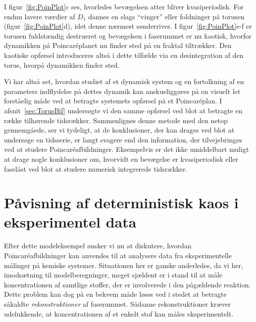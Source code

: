 \vspace{4.0mm}
I figur~\ref{fig:PoinPlot}c ses, hvorledes bev{\ae}gelsen
atter bliver kvasiperiodisk. For endnu lavere v{\ae}rdier
af $D_1$ dannes en slags ``vinger'' eller foldninger p{\aa}
torusen (figur~\ref{fig:PoinPlot}d), idet denne n{\ae}rmest
s{\o}nderrives. I figur~\ref{fig:PoinPlot}e-f er torusen
fuld\-st{\ae}n\-dig destrueret og bev{\ae}gelsen i
faserummet er nu kaotisk, hvorfor dynamikken p{\aa}
Poincar\'{e}planet nu finder sted p{\aa} en fraktal
tiltr{\ae}kker. Den kaotiske opf{\o}rsel introduceres
alts{\aa} i dette tilf{\ae}lde via en desintegration af den
torus, hvorp{\aa} dynamikken finder sted.

\vspace{4.0mm}
Vi har alts{\aa} set, hvordan studiet af et dynamisk system
og en fortolkning af en parameters indflydelse p{\aa}
dettes dynamik kan anskueligg{\o}res p{\aa} en visuelt let
forst{\aa}elig m{\aa}de ved at betragte systemets
opf{\o}rsel p{\aa} et Poincar\'{e}plan. I
afsnit~\ref{sec:TorusBif} unders{\o}gte vi den samme
opf{\o}rsel ved blot at betragte en r{\ae}kke tilh{\o}rende
tidsr{\ae}kker. Sammenlignes denne metode med den netop
gennem\-g{\aa}ede, ser vi tydeligt, at de konklusioner, der
kan drages ved blot at unders{\o}ge en tidsserie, er langt
svagere end den information, der tilvejebringes ved at
studere Poincar\'{e}\-afbild\-ninger. Eksempelvis er det ikke
umiddelbart muligt at drage nogle konklusioner om, hvorvidt
en bev{\ae}gelse er kvasiperiodisk eller fasel{\aa}st ved
blot at studere numerisk integrerede tidsr{\ae}kker.

\section{P{\aa}visning af deterministisk kaos i
eksperimentel data}
\label{sec:ExperimentalPoin}

Efter dette modeleksempel {\o}nsker vi nu at diskutere,
hvordan Poincar\'{e}\-afbild\-ninger kan anvendes til at
analysere data fra eksperimentelle m{\aa}linger p{\aa}
kemiske systemer. Situationen her er ganske anderledes, da
vi her, imods{\ae}t\-ning til modelberegninger, meget
sj{\ae}ldent er i stand til at m{\aa}le koncentrationen af
samtlige stoffer, der er involverede i den
p{\aa}g{\ae}ldende reaktion. Dette problem kan dog p{\aa}
en bekvem m{\aa}de l{\o}ses ved i stedet at betragte
s{\aa}kaldte {\em rekonstruktioner\/} af faserummet.
S{\aa}danne rekonstruktioner kr{\ae}ver udelukkende, at
koncentrationen af et enkelt stof kan m{\aa}les
eksperimentelt.

